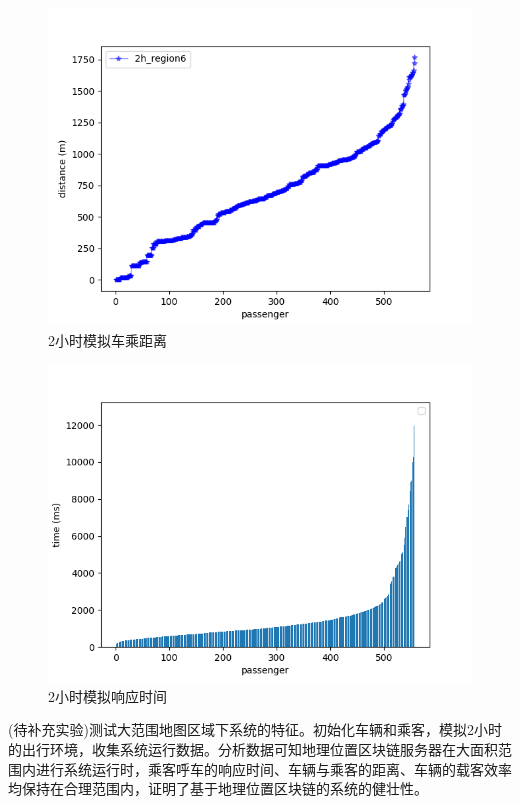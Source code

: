 \begin{figure}
  \centering
  \includegraphics[width=1.0\textwidth]{figures/2hDistance}
  \caption{2小时模拟车乘距离}\label{fig:2hDistance}
\end{figure}

\begin{figure}
  \centering
  \includegraphics[width=1.0\textwidth]{figures/2hTime}
  \caption{2小时模拟响应时间}\label{fig:2hTime}
\end{figure}

(待补充实验)测试大范围地图区域下系统的特征。初始化车辆和乘客，模拟2小时的出行环境，收集系统运行数据。分析数据可知地理位置区块链服务器在大面积范围内进行系统运行时，乘客呼车的响应时间、车辆与乘客的距离、车辆的载客效率均保持在合理范围内，证明了基于地理位置区块链的系统的健壮性。

